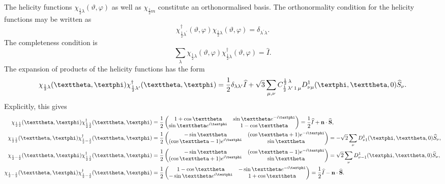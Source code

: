The helicity functions $\chi_{\frac{1}{2} \lambda}(\vartheta, \varphi)$ as well as $\chi_{\frac{1}{2} m}$ constitute an orthonormalised basis. The orthonormality condition for the helicity functions may be written as
\begin{equation}
\chi_{\frac{1}{2} \lambda^{\prime}}^{\dagger}(\vartheta, \varphi) \chi_{\frac{1}{2} \lambda}(\vartheta, \varphi)=\delta_{\lambda^{\prime} \lambda} . \label{eq:6:2:24}
\end{equation}
The completeness condition is
\begin{equation}
\sum_{\lambda} \chi_{\frac{1}{2} \lambda}(\vartheta, \varphi) \chi_{\frac{1}{2} \lambda}^{\dagger}(\vartheta, \varphi)=\hat{I} . \label{eq:6:2:25}
\end{equation}
The expansion of products of the helicity functions has the form
\begin{equation}
\chi_{\frac{1}{2} \lambda}(\vartheta, \varphi) \chi_{\frac{1}{2} \lambda^{\prime}}^{\dagger}(\vartheta, \varphi)=\frac{1}{2} \delta_{\lambda \lambda^{\prime}} \widehat{I}+\sqrt{3} \sum_{\mu, \nu} \clebsch{\frac{1}{2}}{\lambda^{\prime}}{1}{\mu}{\frac{1}{2}}{\lambda} D_{\nu \mu}^{1}(\varphi, \vartheta, 0) \widehat{S}_{\nu}. \label{eq:6:2:26}
\end{equation}
Explicitly, this gives
\begin{align}
\chi_{\frac{1}{2} \frac{1}{2}}(\vartheta, \varphi) \chi_{\frac{1}{2} \frac{1}{2}}^{\dagger}(\vartheta, \varphi) & =\frac{1}{2}\begin{pmatrix}
1+\cos \vartheta & \sin \vartheta e^{-i \varphi} \\
\sin \vartheta e^{i \varphi} & 1-\cos \vartheta
\end{pmatrix}=\frac{1}{2} \widehat{I}+\vect{n} \cdot \widehat{\vect{S}}, \notag\\
\chi_{\frac{1}{2} \frac{1}{2}}(\vartheta, \varphi) \chi_{\frac{1}{2}-\frac{1}{2}}^{\dagger}(\vartheta, \varphi) & =\frac{1}{2}\begin{pmatrix}
-\sin \vartheta & (\cos \vartheta+1) e^{-i \varphi} \\
(\cos \vartheta-1) e^{i \varphi} & \sin \vartheta
\end{pmatrix}=-\sqrt{2} \sum_{\nu} D_{\nu 1}^{1}(\varphi, \vartheta, 0) \widehat{S}_{\nu}, \notag\\
\chi_{\frac{1}{2}-\frac{1}{2}}(\vartheta, \varphi) \chi_{\frac{1}{2} \frac{1}{2}}^{\dagger}(\vartheta, \varphi) & =\frac{1}{2}\begin{pmatrix}
-\sin \vartheta & (\cos \vartheta-1) e^{-i \varphi} \\
(\cos \vartheta+1) e^{i \varphi} & \sin \vartheta
\end{pmatrix}=\sqrt{2} \sum_{\nu} D_{\nu-1}^{1}(\varphi, \vartheta, 0) \widehat{S}_{\nu}, \label{eq:6:2:27}\\
\chi_{\frac{1}{2}-\frac{1}{2}}(\vartheta, \varphi) \chi_{\frac{1}{2}-\frac{1}{2}}^{\dagger}(\vartheta, \varphi) & =\frac{1}{2}\begin{pmatrix}
1-\cos \vartheta & -\sin \vartheta e^{-i \varphi} \\
-\sin \vartheta e^{i \varphi} & 1+\cos \vartheta
\end{pmatrix}=\frac{1}{2} \widehat{I}-\vect{n} \cdot \widehat{\vect{S}} . \notag
\end{align}
